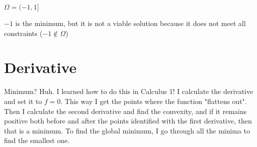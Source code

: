 \begin{minipage}{0.33\linewidth}
    \centering
    \begin{center}
        \( \Omega = (-1, 1] \)

        \begin{adjustwidth}{0.05\linewidth}{0.05\linewidth}
            \( -1 \) is the minimum, but it is not a viable solution because it does not meet all constraints (\( -1 \notin \Omega \))
        \end{adjustwidth}
   \end{center}
\end{minipage}



\section{Derivative}
\label{sec:op.derivative}

Minimum? Huh. I learned how to do this in Calculus 1! I calculate the derivative and set it to \( f = 0 \). This way I get the points where the function "flattens out". Then I calculate the second derivative and find the convexity, and if it remains positive both before and after the points identified with the first derivative, then that is a minimum. To find the global minimum, I go through all the minima to find the smallest one.

